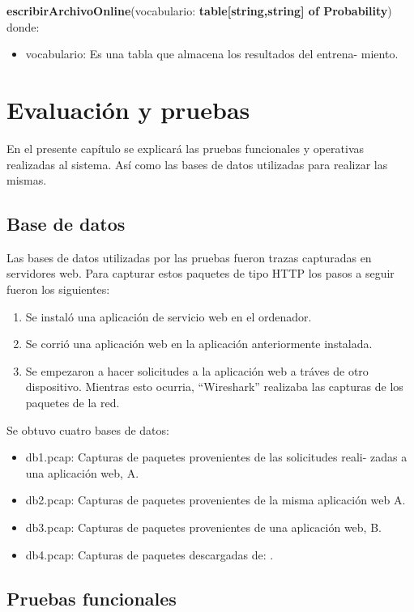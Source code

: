 \textbf{escribirArchivoOnline}(vocabulario: \textbf{table[string,string] of Probability})
donde:
\begin{itemize}
\item vocabulario: Es una tabla que almacena los resultados del entrena-
miento.
\end{itemize}

\section{Evaluación y pruebas}

En el presente capítulo se explicará las pruebas funcionales y operativas
realizadas al sistema. Así como las bases de datos utilizadas para realizar
las mismas.

\subsection{Base de datos}\label{ssec:DB}

Las bases de datos utilizadas por las pruebas fueron trazas capturadas
en servidores web. Para capturar estos paquetes de tipo HTTP los pasos a
seguir fueron los siguientes:

\begin{enumerate}
\item Se instaló una aplicación de servicio web en el ordenador.
\item Se corrió una aplicación web en la aplicación anteriormente instalada.
\item Se empezaron a hacer solicitudes a la aplicación web a tráves de otro
dispositivo. Mientras esto ocurria, ``Wireshark'' realizaba las capturas
de los paquetes de la red.
\end{enumerate}
Se obtuvo cuatro bases de datos:
\begin{itemize}
\item db1.pcap: Capturas de paquetes provenientes de las solicitudes reali-
zadas a una aplicación web, A.
\item db2.pcap: Capturas de paquetes provenientes de la misma aplicación
web A.
\item db3.pcap: Capturas de paquetes provenientes de una aplicación web,
B.
\item db4.pcap: Capturas de paquetes descargadas de: \cite{wireshark}.
\end{itemize}

\subsection{Pruebas funcionales}

